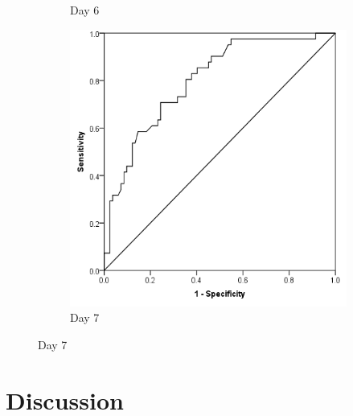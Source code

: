 \begin{figure}[t]
\begin{subfigure}{0.3\textwidth}
		\caption{Day 6}		
		\label{fig:crp_comp_ROC_infection_D6}
	\end{subfigure}
	\begin{subfigure}{0.3\textwidth}
		\centering
		\includegraphics[width=\textwidth]{Figures/crp_comp_ROC_infection_D7}
		\caption{Day 7}
		\label{fig:crp_comp_ROC_infection_D7}
	\end{subfigure}
\end{figure}
\vfill



\clearpage
\section{Discussion}